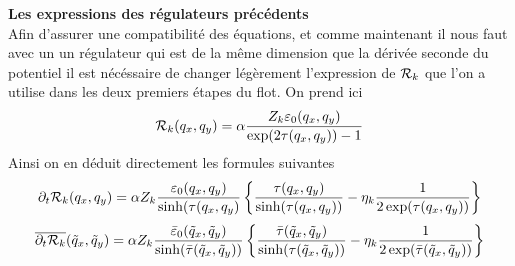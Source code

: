 \documentclass[10pt]{article}
\begin{document}
\vspace*{11pt}
\noindent
\textbf{Les expressions des régulateurs précédents} \\

Afin d'assurer une compatibilité des équations, et comme maintenant il nous faut avec un un régulateur qui est de la même dimension que la dérivée seconde du potentiel il est nécéssaire de changer légèrement l'expression de $\mathcal{R}_k$ que l'on a utilise dans les deux premiers étapes du flot. On prend ici
\begin{equation}
\mathcal{R}_k(q_x, q_y) = \alpha \frac{Z_k \varepsilon_0(q_x, q_y)}{\exp(2\tau(q_x, q_y)) -1}
\end{equation}
Ainsi on en déduit directement les formules suivantes
\begin{equation}
\partial_t \mathcal{R}_k(q_x, q_y) = \alpha Z_k \frac{\varepsilon_0(q_x, q_y)}{\sinh(\tau(q_x, q_y)}   \left\{ \frac{\tau(q_x, q_y)}{\sinh(\tau(q_x, q_y))} - \eta_k \frac{1}{2\exp(\tau(q_x, q_y))} \right\}
\end{equation}
\begin{equation}
\overline{\partial_t \mathcal{R}_k}(\tilde{q}_x, \tilde{q}_y) = \alpha Z_k \frac{\bar{\varepsilon}_0(\tilde{q}_x, \tilde{q}_y)}{\sinh(\bar{\tau}(\tilde{q}_x, \tilde{q}_y))}   \left\{ \frac{\bar{\tau}(\tilde{q}_x, \tilde{q}_y)}{\sinh(\tau(\tilde{q}_x, \tilde{q}_y))} - \eta_k \frac{1}{2\exp(\bar{\tau}(\tilde{q}_x, \tilde{q}_y))} \right\}
\end{equation}
\end{document}
